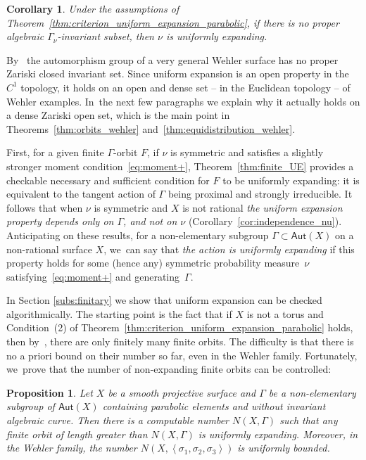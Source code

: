 \documentclass[11pt]{article}
\newcommand{\bra}[1]{\left\langle #1\right\rangle}
\newcommand\Aut{\mathsf{Aut}}
\theoremstyle{plain}
\newtheorem{cor}[thm]{Corollary}
\newtheorem{pro}[thm]{Proposition}
\theoremstyle{definition}
\numberwithin{equation}{section}
\begin{document}
\begin{cor}\label{cor:no_algebraic_invariant_subset}
Under the assumptions of Theorem~\ref{thm:criterion_uniform_expansion_parabolic}, if there is no proper algebraic $\Gamma_\nu$-invariant subset, then
$\nu$ is uniformly expanding.
\end{cor}

By~\cite[Th.\,A]{finite_orbits}
the automorphism group of a very general Wehler surface has no proper Zariski closed invariant set. Since uniform expansion is an open property in the $C^1$ topology,
it holds on an open and dense set -- in the Euclidean topology -- of Wehler examples. In~the next few paragraphs we explain why it actually holds on a dense Zariski open set,
which is the main point in Theorems~\ref{thm:orbits_wehler} and~\ref{thm:equidistribution_wehler}.

First, for a given finite $\Gamma$-orbit $F$,
if $\nu$ is symmetric and satisfies a slightly stronger moment condition~\eqref{eq:moment+}, Theorem~\ref{thm:finite_UE} provides a
checkable necessary and sufficient condition for $F$ to be uniformly expanding:
it is equivalent to the tangent action of $\Gamma$ being proximal and strongly irreducible. It
follows that when $\nu$ is symmetric and $X$ is not rational
{\emph{the uniform expansion property
depends only on $\Gamma$, and not on $\nu$}} (Corollary~\ref{cor:independence_nu}).
Anticipating on these results, for a non-elementary subgroup $\Gamma\subset\Aut(X)$ on a non-rational surface
$X$, we~can say that \emph{the action is uniformly expanding} if this property holds for some (hence any)
symmetric probability measure~$\nu$ satisfying~\eqref{eq:moment+} and
generating~$\Gamma$.

In Section \ref{subs:finitary} we show that uniform expansion can be checked algorithmically.
The starting point is the fact that if $X$ is not a torus and Condition~(2) of
Theorem~\ref{thm:criterion_uniform_expansion_parabolic} holds,
then by~\cite[Th.\,C]{finite_orbits}, there are only finitely many finite orbits.
The difficulty is that there is no a priori bound on their number so far, even in the Wehler family.
Fortunately, we~prove that the number of non-expanding finite orbits can be controlled:

\begin{pro}
Let $X$ be a smooth projective surface and $\Gamma $
be a non-elementary subgroup of $\Aut(X)$
containing parabolic elements and without invariant algebraic curve. Then there is a computable number $N(X, \Gamma)$ such that any finite orbit of length greater than $N(X, \Gamma)$ is uniformly expanding.
Moreover, in the Wehler family, the number $N(X, \bra{\sigma_1, \sigma_2, \sigma_3})$ is uniformly bounded.
\end{pro}
\end{document}
